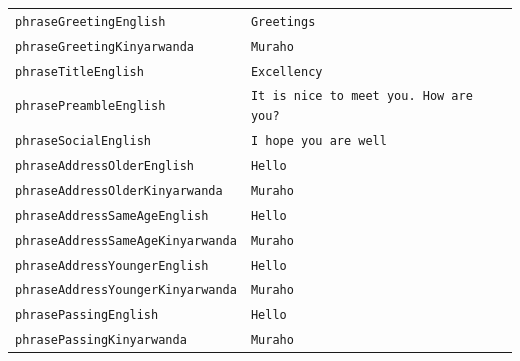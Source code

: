 \documentclass{CSSRforAfrica}
\begin{document}
\begin{table}[H]
\begin{tabular}{l l}
{\footnotesize \verb+phraseGreetingEnglish+}                                  & {\footnotesize \verb+Greetings+}\vspace{-1.5mm} \\
{\footnotesize \verb+phraseGreetingKinyarwanda+}                         & {\footnotesize \verb+Muraho+}\vspace{-1.5mm} \\
{\footnotesize \verb+phraseTitleEnglish+}                                        & {\footnotesize \verb+Excellency+}\vspace{-1.5mm}  \\
{\footnotesize \verb+phrasePreambleEnglish+}                                 & {\footnotesize \verb+It is nice to meet you. How are you?+}\vspace{-1.5mm} \\
{\footnotesize \verb+phraseSocialEnglish+}                                       & {\footnotesize \verb+I hope you are well+}\vspace{-1.5mm} \\
{\footnotesize \verb+phraseAddressOlderEnglish+}                           & {\footnotesize \verb+Hello+ } \vspace{-1.5mm} \\
{\footnotesize \verb+phraseAddressOlderKinyarwanda+}                  & {\footnotesize \verb+Muraho+ } \vspace{-1.5mm} \\
{\footnotesize \verb+phraseAddressSameAgeEnglish+}                     & {\footnotesize \verb+Hello+} \vspace{-1.5mm}  \\
{\footnotesize \verb+phraseAddressSameAgeKinyarwanda+}            & {\footnotesize \verb+Muraho+} \vspace{-1.5mm}  \\
{\footnotesize \verb+phraseAddressYoungerEnglish+}                      & {\footnotesize \verb+Hello+} \vspace{-1.5mm} \\
{\footnotesize \verb+phraseAddressYoungerKinyarwanda+}              & {\footnotesize \verb+Muraho+} \vspace{-1.5mm} \\
{\footnotesize \verb+phrasePassingEnglish+}                                    & {\footnotesize \verb+Hello+} \vspace{-1.5mm} \\
{\footnotesize \verb+phrasePassingKinyarwanda+}                            & {\footnotesize \verb+Muraho+} \vspace{-1.5mm} \\

\end{tabular}
\end{table}
\end{document}

